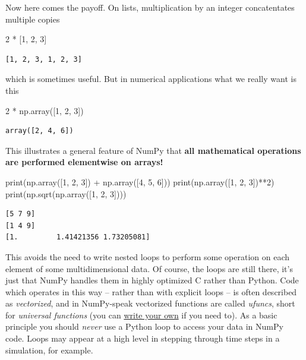 \documentclass[
  letterpaper,
  DIV=11,
  numbers=noendperiod]{scrreprt}
\newenvironment{Shaded}{\begin{snugshade}}{\end{snugshade}}
\newcommand{\BuiltInTok}[1]{\textcolor[rgb]{0.00,0.23,0.31}{#1}}
\newcommand{\DecValTok}[1]{\textcolor[rgb]{0.68,0.00,0.00}{#1}}
\newcommand{\NormalTok}[1]{\textcolor[rgb]{0.00,0.23,0.31}{#1}}
\newcommand{\OperatorTok}[1]{\textcolor[rgb]{0.37,0.37,0.37}{#1}}
\theoremstyle{definition}
\theoremstyle{remark}
\begin{document}
Now here comes the payoff. On lists, multiplication by an integer
concatentates multiple copies

\begin{Shaded}
\begin{Highlighting}[]
\DecValTok{2} \OperatorTok{*}\NormalTok{ [}\DecValTok{1}\NormalTok{, }\DecValTok{2}\NormalTok{, }\DecValTok{3}\NormalTok{]}
\end{Highlighting}
\end{Shaded}

\begin{verbatim}
[1, 2, 3, 1, 2, 3]
\end{verbatim}

which is sometimes useful. But in numerical applications what we really
want is this

\begin{Shaded}
\begin{Highlighting}[]
\DecValTok{2} \OperatorTok{*}\NormalTok{ np.array([}\DecValTok{1}\NormalTok{, }\DecValTok{2}\NormalTok{, }\DecValTok{3}\NormalTok{])}
\end{Highlighting}
\end{Shaded}

\begin{verbatim}
array([2, 4, 6])
\end{verbatim}

This illustrates a general feature of NumPy that \textbf{all
mathematical operations are performed elementwise on arrays!}

\begin{Shaded}
\begin{Highlighting}[]
\BuiltInTok{print}\NormalTok{(np.array([}\DecValTok{1}\NormalTok{, }\DecValTok{2}\NormalTok{, }\DecValTok{3}\NormalTok{]) }\OperatorTok{+}\NormalTok{ np.array([}\DecValTok{4}\NormalTok{, }\DecValTok{5}\NormalTok{, }\DecValTok{6}\NormalTok{]))}
\BuiltInTok{print}\NormalTok{(np.array([}\DecValTok{1}\NormalTok{, }\DecValTok{2}\NormalTok{, }\DecValTok{3}\NormalTok{])}\OperatorTok{**}\DecValTok{2}\NormalTok{)}
\BuiltInTok{print}\NormalTok{(np.sqrt(np.array([}\DecValTok{1}\NormalTok{, }\DecValTok{2}\NormalTok{, }\DecValTok{3}\NormalTok{])))}
\end{Highlighting}
\end{Shaded}

\begin{verbatim}
[5 7 9]
[1 4 9]
[1.         1.41421356 1.73205081]
\end{verbatim}

This avoids the need to write nested loops to perform some operation on
each element of some multidimensional data. Of course, the loops are
still there, it's just that NumPy handles them in highly optimized C
rather than Python. Code which operates in this way -- rather than with
explicit loops -- is often described as \emph{vectorized}, and in
NumPy-speak vectorized functions are called \emph{ufuncs}, short for
\emph{universal functions} (you can
\href{https://numpy.org/doc/stable/reference/ufuncs.html}{write your
own} if you need to). As a basic principle you should \emph{never} use a
Python loop to access your data in NumPy code. Loops may appear at a
high level in stepping through time steps in a simulation, for example.
\end{document}
